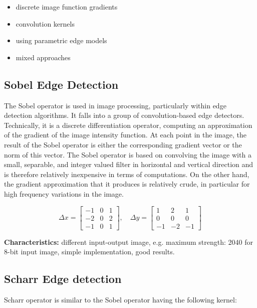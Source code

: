\documentclass[letterpaper,12pt]{article}
\begin{document}
\begin{itemize}
	\item discrete image function gradients
	\item convolution kernels
 	\item using parametric edge models
 	\item mixed approaches

\end{itemize}



\subsection{Sobel Edge Detection}

The Sobel operator is used in image processing, particularly within edge detection algorithms. It falls into a group of convolution-based edge detectors. Technically, it is a discrete differentiation operator, computing an approximation of the gradient of the image intensity function. At each point in the image, the result of the Sobel operator is either the corresponding gradient vector or the norm of this vector. The Sobel operator is based on convolving the image with a small, separable, and integer valued filter in horizontal and vertical direction and is therefore relatively inexpensive in terms of computations. On the other hand, the gradient approximation that it produces is relatively crude, in particular for high frequency variations in the image.

\[	
  	\Delta x = \begin{bmatrix}
  	-1 & 0 & 1 \\
  	-2 & 0 & 2 \\
  	-1 & 0 & 1
	\end{bmatrix}, \quad
	\Delta y = \begin{bmatrix}
  	1 & 2 & 1 \\
  	0 & 0 & 0 \\
  	-1 & -2 & -1
	\end{bmatrix}
\]

\textbf{Characteristics:} different input-output image, e.g. maximum strength: 2040 for 8-bit input image, simple implementation, good results.


\subsection{Scharr Edge detection}

Scharr operator is similar to the Sobel operator having the following kernel:
\end{document}
